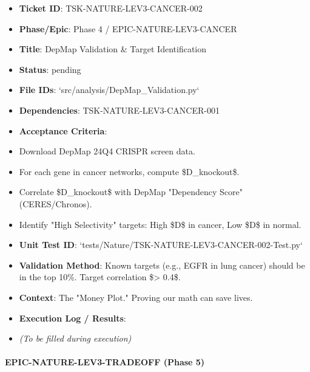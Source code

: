 \documentclass{article}
\begin{document}
\begin{itemize}
\item   \textbf{Ticket ID}: TSK-NATURE-LEV3-CANCER-002
\item   \textbf{Phase/Epic}: Phase 4 / EPIC-NATURE-LEV3-CANCER
\item   \textbf{Title}: DepMap Validation \& Target Identification
\item   \textbf{Status}: pending
\item   \textbf{File IDs}: `src/analysis/DepMap\_Validation.py`
\item   \textbf{Dependencies}: TSK-NATURE-LEV3-CANCER-001
\item   \textbf{Acceptance Criteria}:
\item   Download DepMap 24Q4 CRISPR screen data.
\item   For each gene in cancer networks, compute \$\Delta D\_{knockout}\$.
\item   Correlate \$\Delta D\_{knockout}\$ with DepMap "Dependency Score" (CERES/Chronos).
\item   Identify "High Selectivity" targets: High \$\Delta D\$ in cancer, Low \$\Delta D\$ in normal.
\item   \textbf{Unit Test ID}: `tests/Nature/TSK-NATURE-LEV3-CANCER-002-Test.py`
\item   \textbf{Validation Method}: Known targets (e.g., EGFR in lung cancer) should be in the top 10\%. Target correlation \$\rho > 0.4\$.
\item   \textbf{Context}: The "Money Plot." Proving our math can save lives.
\item   \textbf{Execution Log / Results}:
\item   \textit{(To be filled during execution)}
\end{itemize}

\paragraph{EPIC-NATURE-LEV3-TRADEOFF (Phase 5)}
\end{document}
